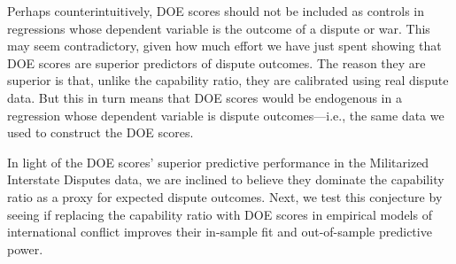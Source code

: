Perhaps counterintuitively, DOE scores should not be included as controls in regressions whose dependent variable is the outcome of a dispute or war.
This may seem contradictory, given how much effort we have just spent showing that DOE scores are superior predictors of dispute outcomes.
The reason they are superior is that, unlike the capability ratio, they are calibrated using real dispute data.
But this in turn means that DOE scores would be endogenous in a regression whose dependent variable is dispute outcomes---i.e., the same data we used to construct the DOE scores.

In light of the DOE scores' superior predictive performance in the Militarized Interstate Disputes data, we are inclined to believe they dominate the capability ratio as a proxy for expected dispute outcomes.
Next, we test this conjecture by seeing if replacing the capability ratio with DOE scores in empirical models of international conflict improves their in-sample fit and out-of-sample predictive power.

